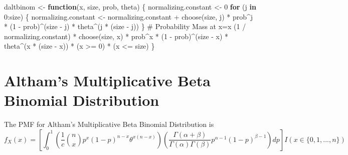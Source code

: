 \documentclass[
]{article}
\newenvironment{Shaded}{\begin{snugshade}}{\end{snugshade}}
\newcommand{\CommentTok}[1]{\textcolor[rgb]{0.37,0.37,0.37}{#1}}
\newcommand{\ControlFlowTok}[1]{\textcolor[rgb]{0.00,0.23,0.31}{\textbf{#1}}}
\newcommand{\DecValTok}[1]{\textcolor[rgb]{0.68,0.00,0.00}{#1}}
\newcommand{\FunctionTok}[1]{\textcolor[rgb]{0.28,0.35,0.67}{#1}}
\newcommand{\NormalTok}[1]{\textcolor[rgb]{0.00,0.23,0.31}{#1}}
\newcommand{\OtherTok}[1]{\textcolor[rgb]{0.00,0.23,0.31}{#1}}
\newcommand{\SpecialCharTok}[1]{\textcolor[rgb]{0.37,0.37,0.37}{#1}}
\begin{document}
\begin{Shaded}
\begin{Highlighting}[numbers=left,,]
\NormalTok{daltbinom }\OtherTok{\textless{}{-}} \ControlFlowTok{function}\NormalTok{(x, size, prob, theta) \{}
\NormalTok{  normalizing.constant }\OtherTok{\textless{}{-}} \DecValTok{0}
  \ControlFlowTok{for}\NormalTok{ (j }\ControlFlowTok{in} \DecValTok{0}\SpecialCharTok{:}\NormalTok{size) \{}
\NormalTok{    normalizing.constant }\OtherTok{\textless{}{-}}\NormalTok{ normalizing.constant }\SpecialCharTok{+}
      \FunctionTok{choose}\NormalTok{(size, j) }\SpecialCharTok{*}\NormalTok{ prob}\SpecialCharTok{\^{}}\NormalTok{j }\SpecialCharTok{*}\NormalTok{ (}\DecValTok{1} \SpecialCharTok{{-}}\NormalTok{ prob)}\SpecialCharTok{\^{}}\NormalTok{(size }\SpecialCharTok{{-}}\NormalTok{ j) }\SpecialCharTok{*}\NormalTok{ theta}\SpecialCharTok{\^{}}\NormalTok{(j }\SpecialCharTok{*}\NormalTok{ (size }\SpecialCharTok{{-}}\NormalTok{ j))}
\NormalTok{  \}}
  \CommentTok{\# Probability Mass at x=x}
\NormalTok{  (}\DecValTok{1} \SpecialCharTok{/}\NormalTok{ normalizing.constant) }\SpecialCharTok{*}
    \FunctionTok{choose}\NormalTok{(size, x) }\SpecialCharTok{*}
\NormalTok{    prob}\SpecialCharTok{\^{}}\NormalTok{x }\SpecialCharTok{*}
\NormalTok{    (}\DecValTok{1} \SpecialCharTok{{-}}\NormalTok{ prob)}\SpecialCharTok{\^{}}\NormalTok{(size }\SpecialCharTok{{-}}\NormalTok{ x) }\SpecialCharTok{*}
\NormalTok{    theta}\SpecialCharTok{\^{}}\NormalTok{(x }\SpecialCharTok{*}\NormalTok{ (size }\SpecialCharTok{{-}}\NormalTok{ x)) }\SpecialCharTok{*}
\NormalTok{    (x }\SpecialCharTok{\textgreater{}=} \DecValTok{0}\NormalTok{) }\SpecialCharTok{*}
\NormalTok{    (x }\SpecialCharTok{\textless{}=}\NormalTok{ size)}
\NormalTok{\}}
\end{Highlighting}
\end{Shaded}

\normalsize

\section{Altham's Multiplicative Beta Binomial
Distribution}\label{althams-multiplicative-beta-binomial-distribution}

The PMF for Altham's Multiplicative Beta Binomial Distribution is
\[f_X(x) = \left[\int_{0}^1 \left(\frac{1}{c} {n \choose x} p^x (1-p)^{n-x} \theta^{x(n-x)}\right)\left(\frac{\Gamma(\alpha+\beta)}{\Gamma(\alpha)\Gamma(\beta)} p^{\alpha-1}(1-p)^{\beta-1}\right) dp\right]I(x \in \{0, 1, ..., n\})\]
\end{document}
